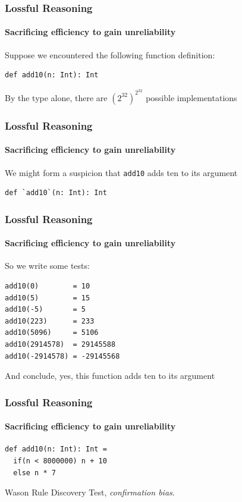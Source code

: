 \begin{frame}[fragile]
\frametitle{Lossful Reasoning}
\framesubtitle{Sacrificing efficiency to gain unreliability}
Suppose we encountered the following function definition:
\begin{lstlisting}[style=scala]
def add10(n: Int): Int
\end{lstlisting}
By the type alone, there are {$({2^{32}})^{2^{32}}$} possible implementations
\end{frame}

\begin{frame}[fragile]
\frametitle{Lossful Reasoning}
\framesubtitle{Sacrificing efficiency to gain unreliability}
We might form a suspicion that \lstinline[style=scala]$add10$ adds ten to its argument
\begin{lstlisting}[style=scala]
def `add10`(n: Int): Int
\end{lstlisting}
\end{frame}

\begin{frame}[fragile]
\frametitle{Lossful Reasoning}
\framesubtitle{Sacrificing efficiency to gain unreliability}
So we write some tests:
\begin{lstlisting}[style=scala]
add10(0)        = 10
add10(5)        = 15
add10(-5)       = 5
add10(223)      = 233
add10(5096)     = 5106
add10(2914578)  = 29145588
add10(-2914578) = -29145568
\end{lstlisting}
And conclude, yes, this function adds ten to its argument
\end{frame}

\begin{frame}[fragile]
\frametitle{Lossful Reasoning}
\framesubtitle{Sacrificing efficiency to gain unreliability}
\begin{lstlisting}[style=scala]
def add10(n: Int): Int =
  if(n < 8000000) n + 10
  else n * 7
\end{lstlisting}
Wason Rule Discovery Test, \emph{confirmation bias\cite{gale2002does}}.
\end{frame}

